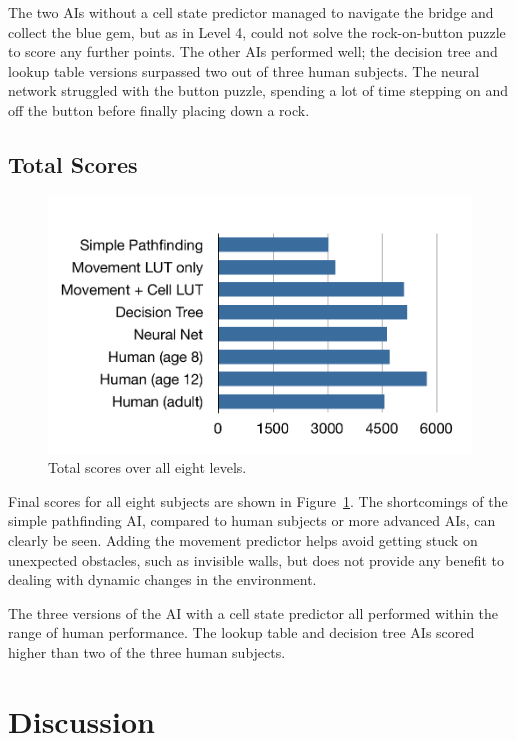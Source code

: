 \documentclass{article}
\begin{document}
The two AIs without a cell state predictor managed to navigate the bridge and collect the blue gem, but as in Level 4, could not solve the rock-on-button puzzle to score any further points.  The other AIs performed well; the decision tree and lookup table versions surpassed two out of three human subjects.  The neural network struggled with the button puzzle, spending a lot of time stepping on and off the button before finally placing down a rock.


\subsection{Total Scores}

\begin{figure}
  \begin{center}
    \includegraphics[width=4.5in]{figTotalScores.pdf}
    \caption{Total scores over all eight levels.}
    \label{figTotalScores}
  \end{center}
\end{figure}

Final scores for all eight subjects are shown in Figure~\ref{figTotalScores}.  The shortcomings of the simple pathfinding AI, compared to human subjects or more advanced AIs, can clearly be seen.  Adding the movement predictor helps avoid getting stuck on unexpected obstacles, such as invisible walls, but does not provide any benefit to dealing with dynamic changes in the environment.

The three versions of the AI with a cell state predictor all performed within the range of human performance.  The lookup table and decision tree AIs scored higher than two of the three human subjects.

\section{Discussion}
\end{document}
